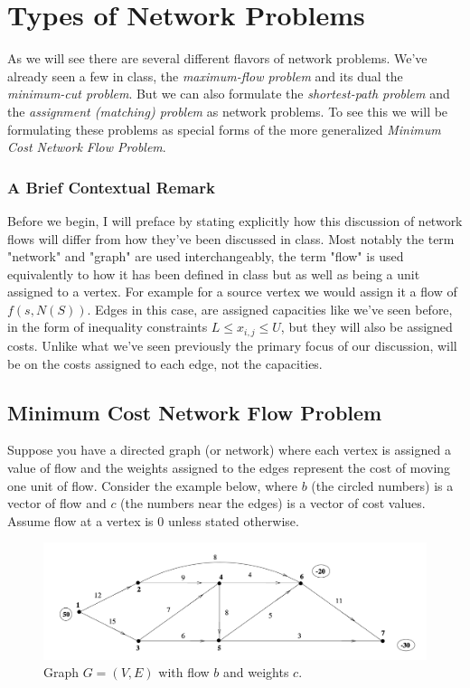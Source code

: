 \documentclass[12pt]{amsart}
\begin{document}
\section{Types of Network Problems}

As we will see there are several different flavors of network problems. We've already seen a few in class, the \emph{maximum-flow problem} and its dual the \emph{minimum-cut problem}. But we can also formulate the \emph{shortest-path problem} and the \emph{assignment (matching) problem} as network problems. To see this we will be formulating these problems as special forms of the more generalized \emph{Minimum Cost Network Flow Problem}.

\subsubsection{A Brief Contextual Remark}
Before we begin, I will preface by stating explicitly how this discussion of network flows will differ from how they've been discussed in class. Most notably the term "network" and "graph" are used interchangeably, the term "flow" is used equivalently to how it has been defined in class but as well as being a unit assigned to a vertex. For example for a source vertex we would assign it a flow of $f(s, N(S))$. Edges in this case, are assigned capacities like we've seen before, in the form of inequality constraints $L \leq x_{i, j} \leq U$, but they will also be assigned costs. Unlike what we've seen previously the primary focus of our discussion, will be on the costs assigned to each edge, not the capacities.\\


\subsection{Minimum Cost Network Flow Problem}

Suppose you have a directed graph (or network) where each vertex is assigned a value of flow and the weights assigned to 
the edges represent the cost of moving one unit of flow. Consider the example below, where $b$ (the circled numbers) is a vector of flow and $c$ (the numbers near the edges) is 
a vector of cost values. Assume flow at a vertex is 0 unless stated otherwise.  

\begin{figure}[H]
  \begin{center}
    \caption{Graph $G = (V, E)$ with flow $b$ and weights $c$.}
    \includegraphics[width=.90\textwidth]{SampleNetwork.png}
  \end{center}
\end{figure}
\end{document}

